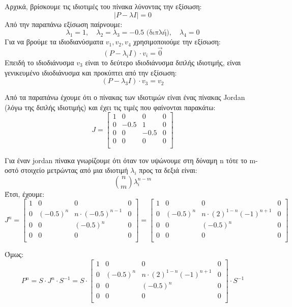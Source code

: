\documentclass[a4paper,oneside, 11pt]{article}
\begin{document}
Αρχικά, βρίσκουμε τις ιδιοτιμές του πίνακα λύνοντας την εξίσωση:
$$
|P - \lambda I| = 0
$$ 
Από την παραπάνω εξίσωση παίρνουμε:
$$
\lambda_1 = 1, \quad \lambda_2 = \lambda_3 = -0.5 \textrm{ (διπλή)}, \quad \lambda_4 = 0 
$$
Για να βρούμε τα ιδιοδιανύσματα $v_1, v_2, v_4$ χρησιμοποιούμε την εξίσωση:
$$
(P - \lambda_i I)\cdot v_i = \vec 0
$$
Επειδή το ιδιοδιάνυσμα $v_3$ είναι το δεύτερο ιδιοδιάνυσμα διπλής ιδιοτιμής, είναι γενικευμένο ιδιοδιάνυσμα και προκύπτει από την εξίσωση:
$$
(P - \lambda_3 I)\cdot v_3 = v_2
$$


Από τα παραπάνω έχουμε ότι ο πίνακας των ιδιοτιμών είναι ένας πίνακας Jordan (λόγω της διπλής ιδιοτιμής) και έχει τις τιμές που φαίνονται παρακάτω:
$$
J = \begin{bmatrix}
1 & 0 & 0 & 0 \\
0 & -0.5 & 1 & 0 \\
0 & 0 & -0.5 & 0 \\
0 & 0 & 0 & 0 \\
\end{bmatrix}
$$

Για έναν jordan πίνακα γνωρίζουμε ότι όταν τον υψώνουμε στη δύναμη n τότε το m-οστό στοιχείο μετρώντας από μια ιδιοτιμή $\lambda_i$ προς τα δεξιά είναι:
$$
\binom{n}{m} \lambda_i^{n-m}
$$
Έτσι, έχουμε:
$$
J^n = \begin{bmatrix}
1 & 0 & 0 & 0 \\
0 & (-0.5)^n & n \cdot (-0.5)^{n-1} & 0 \\
0 & 0 & (-0.5)^n & 0 \\
0 & 0 & 0 & 0 \\
\end{bmatrix} = \begin{bmatrix}
1 & 0 & 0 & 0 \\
0 & (-0.5)^n & n \cdot (2)^{1-n} (-1)^{n+1} & 0 \\
0 & 0 & (-0.5)^n & 0 \\
0 & 0 & 0 & 0 \\
\end{bmatrix}
$$


Όμως:
$$
P^n = S \cdot J^n \cdot S^{-1} = S \cdot \begin{bmatrix}
1 & 0 & 0 & 0 \\
0 & (-0.5)^n & n \cdot (2)^{1-n} (-1)^{n+1} & 0 \\
0 & 0 & (-0.5)^n & 0 \\
0 & 0 & 0 & 0 \\
\end{bmatrix} \cdot S^{-1}
$$
\end{document}
